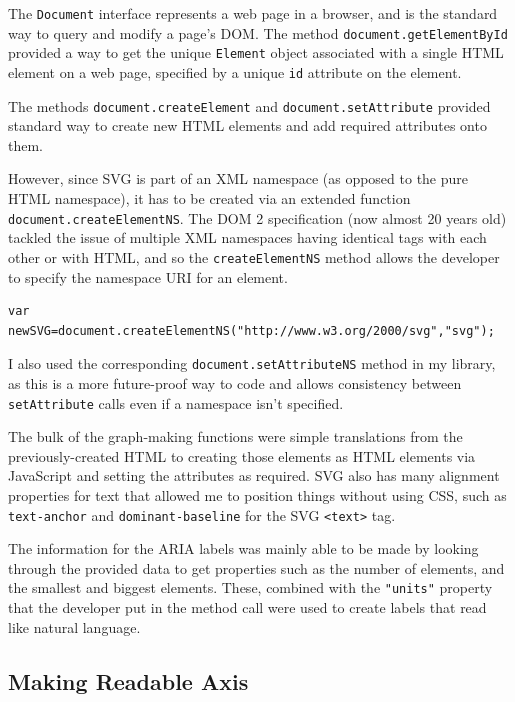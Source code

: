 \documentclass[ %
                    author={Aleena Baig},
                supervisor={Dr Simon Lock},
                    degree={BSc},
                     title={On Making Web Accessible Graphs},
                  subtitle={},
                      year={2019} ]{dissertation}
\begin{document}
The \texttt{Document} interface represents a web page in a browser, and is the standard way to query and modify a page's DOM. The method \texttt{document.getElementById} provided a way to get the unique \texttt{Element} object associated with a single HTML element on a web page, specified by a unique \texttt{id} attribute on the element.


The methods \texttt{document.createElement} and \texttt{document.setAttribute} provided standard way to create new HTML elements and add required attributes onto them.

However, since SVG is part of an XML namespace (as opposed to the pure HTML namespace), it has to be created via an extended function \texttt{document.createElementNS}. The DOM 2 specification (now almost 20 years old) tackled the issue of multiple XML namespaces having identical tags with each other or with HTML, and so the \texttt{createElementNS} method allows the developer to specify the namespace URI for an element.

\begin{lstlisting}
var newSVG=document.createElementNS("http://www.w3.org/2000/svg","svg");
\end{lstlisting}

I also used the corresponding \texttt{document.setAttributeNS} method in my library, as this is a more future-proof way to code and allows consistency between \texttt{setAttribute} calls even if a namespace isn't specified.

The bulk of the graph-making functions were simple translations from the previously-created HTML to creating those elements as HTML elements via JavaScript and setting the attributes as required. SVG also has many alignment properties for text that allowed me to position things without using CSS, such as \texttt{text-anchor} and \texttt{dominant-baseline} for the SVG \texttt{<text>} tag.

The information for the ARIA labels was mainly able to be made by looking through the provided data to get properties such as the number of elements, and the smallest and biggest elements. These, combined with the \texttt{"units"} property that the developer put in the method call were used to create labels that read like natural language.


\subsection{Making Readable Axis}
\end{document}
